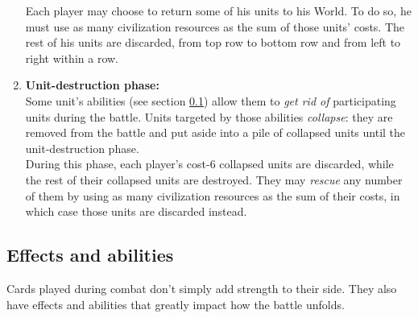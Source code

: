 \documentclass[a4paper]{article}
\begin{document}
\begin{enumerate}
                Each player may choose to return some of his units to his World.
                To do so, he must use as many civilization resources
                as the sum of those units' costs.
                The rest of his units are discarded,
                from top row to bottom row and from left to right within a row.
            \item \textbf{Unit-destruction phase:}\\
                Some unit's abilities (see section \ref{abilities}) allow them
                to \textit{get rid of} participating units during the battle.
                Units targeted by those abilities \textit{collapse}:
                they are removed from the battle and put aside
                into a pile of collapsed units until the unit-destruction phase.\\
                During this phase, each player's cost-6 collapsed units are discarded,
                while the rest of their collapsed units are destroyed.
                They may \textit{rescue} any number of them by using
                as many civilization resources as the sum of their costs,
                in which case those units are discarded instead.      
        \end{enumerate}

\newpage
    \subsection{Effects and abilities}
        \label{abilities}
        Cards played during combat don't simply add strength to their side.
        They also have effects and abilities that greatly impact how the battle unfolds.
\end{document}
